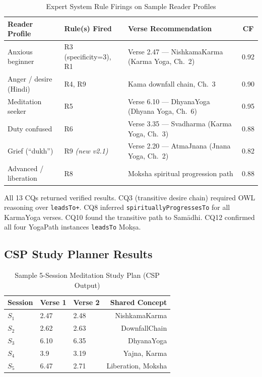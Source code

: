 \documentclass[conference]{IEEEtran}
\begin{document}
\begin{table}[!t]
\caption{Expert System Rule Firings on Sample Reader Profiles}
\label{tab:expert}
\centering
\begin{tabular}{@{}l l l c@{}}
\toprule
\textbf{Reader Profile} & \textbf{Rule(s) Fired} & \textbf{Verse Recommendation} & \textbf{CF} \\
\midrule
Anxious beginner          & R3 (specificity=3), R1 & Verse 2.47 — NishkamaKarma (Karma Yoga, Ch.~2)  & 0.92 \\
Anger / desire (Hindi)    & R4, R9                 & Kama downfall chain, Ch.~3                       & 0.90 \\
Meditation seeker         & R5                     & Verse 6.10 — DhyanaYoga (Dhyana Yoga, Ch.~6)    & 0.95 \\
Duty confused             & R6                     & Verse 3.35 — Svadharma (Karma Yoga, Ch.~3)      & 0.88 \\
Grief (``dukh'')          & R9 \textit{(new v2.1)} & Verse 2.20 — AtmaJnana (Jnana Yoga, Ch.~2)      & 0.82 \\
Advanced / liberation     & R8                     & Moksha spiritual progression path               & 0.88 \\
\bottomrule
\end{tabular}
\end{table}

All 13 CQs returned verified results. CQ3 (transitive desire chain) required
OWL reasoning over \texttt{leadsTo+}. CQ8 inferred \texttt{spirituallyProgressesTo}
for all KarmaYoga verses. CQ10 found the transitive path to Sam\={a}dhi.
CQ12 confirmed all four YogaPath instances \texttt{leadsTo} Mok\d{s}a.

\subsection{CSP Study Planner Results}

\begin{table}[htbp]
\caption{Sample 5-Session Meditation Study Plan (CSP Output)}
\label{tab:csp}
\centering
\begin{tabular}{lllr}
\toprule
\textbf{Session} & \textbf{Verse 1} & \textbf{Verse 2} & \textbf{Shared Concept} \\
\midrule
$S_1$ & 2.47 & 2.48 & NishkamaKarma \\
$S_2$ & 2.62 & 2.63 & DownfallChain \\
$S_3$ & 6.10 & 6.35 & DhyanaYoga \\
$S_4$ & 3.9  & 3.19 & Yajna, Karma \\
$S_5$ & 6.47 & 2.71 & Liberation, Moksha \\
\bottomrule
\end{tabular}
\end{table}
\end{document}
